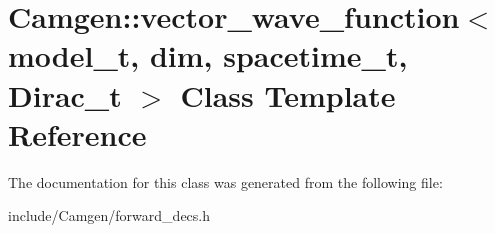 \hypertarget{a00564}{\section{Camgen\-:\-:vector\-\_\-wave\-\_\-function$<$ model\-\_\-t, dim, spacetime\-\_\-t, Dirac\-\_\-t $>$ Class Template Reference}
\label{a00564}
}


The documentation for this class was generated from the following file\-:\begin{DoxyCompactItemize}
\item 
include/\-Camgen/forward\-\_\-decs.\-h\end{DoxyCompactItemize}
